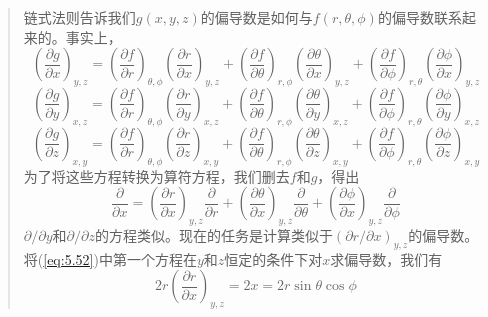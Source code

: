 \begin{quote}
        链式法则告诉我们$g\left(x,y,z\right)$的偏导数是如何与$f\left(r,\theta,\phi\right)$的偏导数联系起来的。事实上，
        \begin{equation}
            \left(\frac{\partial g}{\partial x}\right)_{y,z} = \left(\frac{\partial f}{\partial r}\right)_{\theta,\phi}\left(\frac{\partial r}{\partial x}\right)_{y,z} + \left(\frac{\partial f}{\partial \theta}\right)_{r,\phi}\left(\frac{\partial \theta}{\partial x}\right)_{y,z} + \left(\frac{\partial f}{\partial \phi}\right)_{r,\theta}\left(\frac{\partial \phi}{\partial x}\right)_{y,z}
            \label{eq:5.53}
        \end{equation}
        \begin{equation}
            \left(\frac{\partial g}{\partial y}\right)_{x,z} = \left(\frac{\partial f}{\partial r}\right)_{\theta,\phi}\left(\frac{\partial r}{\partial y}\right)_{x,z} + \left(\frac{\partial f}{\partial \theta}\right)_{r,\phi}\left(\frac{\partial \theta}{\partial y}\right)_{x,z} + \left(\frac{\partial f}{\partial \phi}\right)_{r,\theta}\left(\frac{\partial \phi}{\partial y}\right)_{x,z}
            \label{eq:5.54}
        \end{equation}
        \begin{equation}
            \left(\frac{\partial g}{\partial z}\right)_{x,y} = \left(\frac{\partial f}{\partial r}\right)_{\theta,\phi}\left(\frac{\partial r}{\partial z}\right)_{x,y} + \left(\frac{\partial f}{\partial \theta}\right)_{r,\phi}\left(\frac{\partial \theta}{\partial z}\right)_{x,y} + \left(\frac{\partial f}{\partial \phi}\right)_{r,\theta}\left(\frac{\partial \phi}{\partial z}\right)_{x,y}
            \label{eq:5.55}
        \end{equation}
        为了将这些方程转换为算符方程，我们删去$f$和$g$，得出
        \begin{equation}
            \frac{\partial}{\partial x} = \left(\frac{\partial r}{\partial x}\right)_{y,z}\frac{\partial}{\partial r} + \left(\frac{\partial \theta}{\partial x}\right)_{y,z}\frac{\partial}{\partial \theta} + \left(\frac{\partial \phi}{\partial x}\right)_{y,z}\frac{\partial}{\partial \phi}
            \label{eq:5.56}
        \end{equation}
        $\partial /\partial y$和$\partial /\partial z$的方程类似。现在的任务是计算类似于$\left(\partial r/\partial x\right)_{y,z}$的偏导数。将(\ref{eq:5.52})中第一个方程在$y$和$z$恒定的条件下对$x$求偏导数，我们有
        \begin{equation*}
            2r\left(\frac{\partial r}{\partial x}\right)_{y,z} = 2x = 2r\sin\theta\cos\phi

\end{equation*}
\end{quote}
